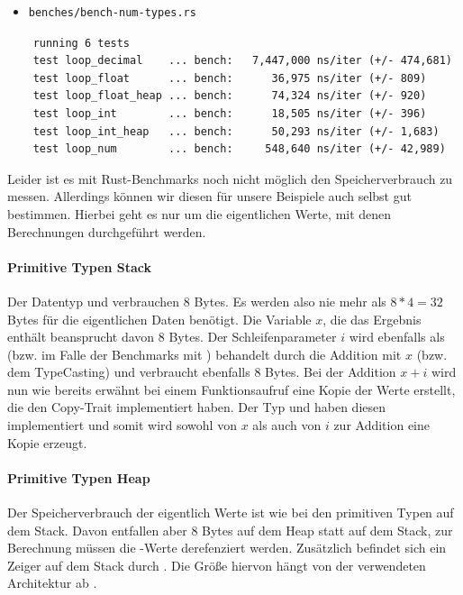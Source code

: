 \documentclass[11pt,a4paper, ngerman]{article}
\begin{document}
\begin{itemize}
    \item \begin{verbatim}benches/bench-num-types.rs\end{verbatim}
\end{itemize}

\begin{verbatim}
    running 6 tests
    test loop_decimal    ... bench:   7,447,000 ns/iter (+/- 474,681)
    test loop_float      ... bench:      36,975 ns/iter (+/- 809)
    test loop_float_heap ... bench:      74,324 ns/iter (+/- 920)
    test loop_int        ... bench:      18,505 ns/iter (+/- 396)
    test loop_int_heap   ... bench:      50,293 ns/iter (+/- 1,683)
    test loop_num        ... bench:     548,640 ns/iter (+/- 42,989)
\end{verbatim}

Leider ist es mit Rust-Benchmarks noch nicht möglich den Speicherverbrauch zu messen. Allerdings können wir diesen für unsere Beispiele auch selbst gut bestimmen. Hierbei geht es nur um die eigentlichen Werte, mit denen Berechnungen durchgeführt werden.

\paragraph{Primitive Typen Stack} Der Datentyp  und  verbrauchen 8 Bytes. Es werden also nie mehr als $8*4=32$ Bytes für die eigentlichen Daten benötigt. Die Variable $x$, die das Ergebnis enthält beansprucht davon 8 Bytes. Der Schleifenparameter $i$ wird ebenfalls als  (bzw.  im Falle der Benchmarks mit ) behandelt durch die Addition mit $x$ (bzw. dem TypeCasting) und verbraucht ebenfalls 8 Bytes. Bei der Addition $x+i$ wird nun wie bereits erwähnt bei einem Funktionsaufruf eine Kopie der Werte erstellt, die den Copy-Trait implementiert haben. Der Typ  und  haben diesen implementiert \cite{Rusti64Copy} und somit wird sowohl von $x$ als auch von $i$ zur Addition eine Kopie erzeugt.

\paragraph{Primitive Typen Heap} Der Speicherverbrauch der eigentlich Werte ist wie bei den primitiven Typen auf dem Stack. Davon entfallen aber 8 Bytes auf dem Heap statt auf dem Stack, zur Berechnung müssen die -Werte derefenziert werden. Zusätzlich befindet sich ein Zeiger auf dem Stack durch . Die Größe hiervon hängt von der verwendeten Architektur ab \cite{BoxExmaple}.
\end{document}
